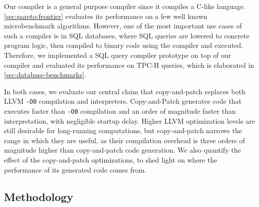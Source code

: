 \documentclass[acmsmall,nonacm,screen]{acmart}\settopmatter{printfolios=true,printccs=true,printacmref=false}
\newcommand{\todo}[1]{{\color{red}(#1)}}
\newcommand{\secref}[1]{\autoref{#1}}
\newcommand{\llvm}{LLVM}
\newcommand{\ozero}{\texttt{-O0}}
\newcommand{\oone}{\texttt{-O1}}
\newcommand{\cp}{copy-and-patch}
\newcommand{\cpcap}{Copy-and-Patch}
\newcommand{\stencilSize}{\SI{17.5}{\mega\byte}}
\newcommand{\stencilGenTime}{\SI{14}{\minute}}
\begin{document}
Our compiler is a general purpose compiler since it compiles a C-like language. \secref{sec:pareto-frontier} evaluates its performance on a few well known microbenchmark algorithms. However, one of the most important use cases of such a compiler is in SQL databases, where SQL queries are lowered to concrete program logic, then compiled to binary code using the compiler and executed. Therefore, we implemented a SQL query compiler prototype on top of our compiler and evaluated its performance on TPC-H queries, which is  elaborated in \secref{sec:database-benchmarks}.

In both cases, we evaluate our central claim that \cp{} replaces both \llvm{} \ozero{} compilation and interpreters. \cpcap{} generates code that executes faster than \ozero{} compilation and an order of magnitude faster than interpretation, with negligible startup delay. Higher \llvm{} optimization levels are still desirable for long-running computations, but \cp{} narrows the range in which they are useful, as their compilation overhead is three orders of magnitude higher than \cp{} code generation. We also quantify the effect of the \cp{} optimizations, to shed light on where the performance of its generated code comes from.




\subsection{Methodology}
\end{document}
